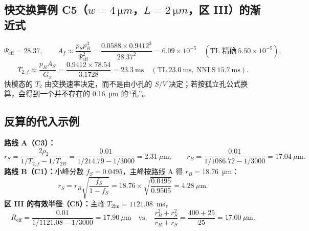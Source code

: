 \subsection{快交换算例 C5（$w=\SI{4}{\micro m}$，$L=\SI{2}{\micro m}$，区 III）的渐近式}
\[
\Psi_{\mathrm{eff}}=28.37,\qquad A_f\approx\frac{p_Sp_B^3}{\Psi_{\mathrm{eff}}^2}=\frac{0.0588\times0.9412^3}{28.37^2}=6.09\times10^{-5}\quad(\text{TL 精确}\ 5.50\times10^{-5}),
\]
\[
T_{2,f}\approx\frac{p_BA_S}{G_x}=\frac{0.9412\times78.54}{3.1728}=23.3\ \mathrm{ms}\quad(\text{TL}\ 23.0\ \mathrm{ms},\ \text{NNLS}\ 15.7\ \mathrm{ms}).
\]
快模态的 $T_2$ 由交换速率决定，而不是由小孔的 $S/V$ 决定；若按孤立孔公式换算，会得到一个并不存在的 0.16~\si{\micro m} 的“孔”。

\subsection{反算的代入示例}
\textbf{路线 A（C3）：}
\[
r_S=\frac{2\rho_2}{1/T_{2,f}-1/T_{2B}}=\frac{0.01}{1/214.79-1/3000}=2.31\ \mu\mathrm{m},\qquad r_B=\frac{0.01}{1/1086.72-1/3000}=17.04\ \mu\mathrm{m}.
\]
\textbf{路线 B（C1）：}小峰分数 $f_S=0.0495$，主峰按路线 A 得 $r_B=18.76$~\si{\micro m}：
\[
r_S=r_B\sqrt{\frac{f_S}{1-f_S}}=18.76\times\sqrt{\frac{0.0495}{0.9505}}=4.28\ \mu\mathrm{m}.
\]
\textbf{区 III 的有效半径（C5）：}主峰 $T_{2\mathrm{lm}}=1121.08$~ms，
\[
R_{\mathrm{eff}}=\frac{0.01}{1/1121.08-1/3000}=17.90\ \mu\mathrm{m}\quad\text{vs.}\quad\frac{r_B^2+r_S^2}{r_B+r_S}=\frac{400+25}{25}=17.00\ \mu\mathrm{m}.
\]
